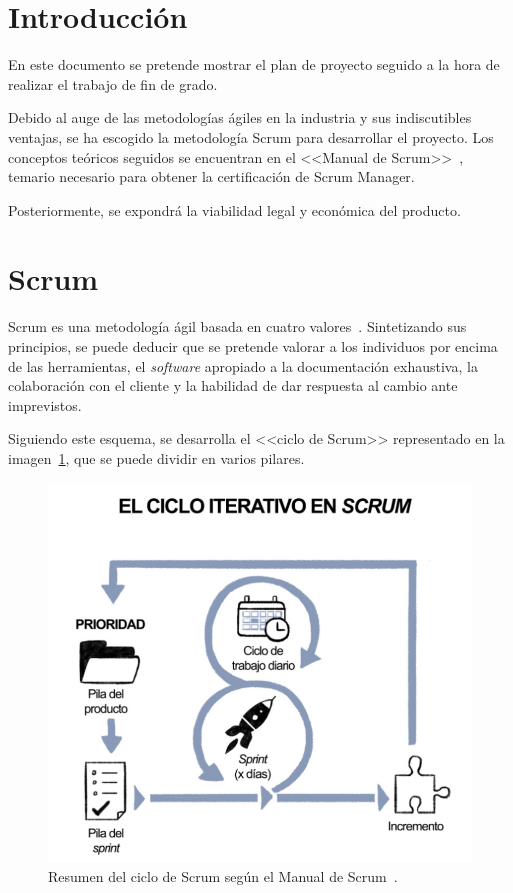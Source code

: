
\section{Introducción}

En este documento se pretende mostrar el plan de proyecto seguido a la hora de realizar el trabajo de fin de grado.

Debido al auge de las metodologías ágiles en la industria y sus indiscutibles ventajas, se ha escogido la metodología Scrum para desarrollar el proyecto. Los conceptos teóricos seguidos se encuentran en el <<Manual de Scrum>>~\cite{scrumMaster2022}, temario necesario para obtener la certificación de Scrum Manager.

Posteriormente, se expondrá la viabilidad legal y económica del producto.

\section{Scrum}

Scrum es una metodología ágil basada en cuatro valores~\cite{scrumMaster2022}. Sintetizando sus principios, se puede deducir que se pretende valorar a los individuos por encima de las herramientas, el \textit{software} apropiado a la documentación exhaustiva, la colaboración con el cliente y la habilidad de dar respuesta al cambio ante imprevistos.

Siguiendo este esquema, se desarrolla el <<ciclo de Scrum>> representado en la imagen~\ref{img:ciclo_scrum}, que se puede dividir en varios pilares.

\begin{figure}[h]
	\caption[Resumen del ciclo de Scrum]{Resumen del ciclo de Scrum según el Manual de Scrum~\cite{scrumMaster2022}.}
	\label{img:ciclo_scrum}
	\centering
	\includegraphics[scale=0.45]{../img/anexos/scrum/ciclo}
\end{figure}

